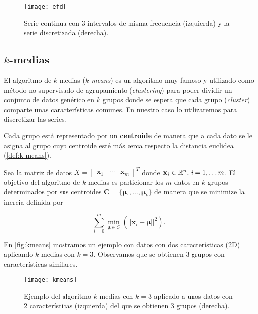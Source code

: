 \begin{figure}[htpb]
  \centering
  \texttt{[image: efd]}
  \caption{Serie continua con 3 intervalos de misma frecuencia (izquierda) y la serie discretizada (derecha).}
  \label{fig:efd}
\end{figure}

\subsection{$k$-medias}

El algoritmo de $k$-medias (\emph{$k$-means}) \cite{macqueen1967some} es un algoritmo muy famoso y utilizado como método no supervisado de agrupamiento (\emph{clustering}) para poder dividir un conjunto de datos genérico en $k$ grupos donde se espera que cada grupo (\emph{cluster}) comparte unas características comunes. En nuestro caso lo utilizaremos para discretizar las series.

Cada grupo está representado por un \textbf{centroide} de manera que a cada dato se le asigna al grupo cuyo centroide esté más cerca respecto la distancia euclidea (\autoref{def:k-means}).

\begin{definicion}[$k$-medias]
  Sea la matriz de datos $X = \begin{bmatrix} \textbf{x}_1 & \cdots & \textbf{x}_m \end{bmatrix}^T$ donde $\textbf{x}_i \in \mathbb{R}^n, \, i = 1, \ldots m$. El objetivo del algoritmo de $k$-medias es particionar los $m$ datos en $k$ grupos determinados por sus centroides $\textbf{C} = \{\pmb{\mu}_1, \ldots, \pmb{\mu}_k\}$ de manera que se minimize la inercia definida por

  $$\sum \limits^m_{i = 0} \min \limits_{\pmb{\mu} \in C} \left(||\textbf{x}_i - \pmb\mu ||^2 \right).$$
  \label{def:k-means}
\end{definicion}

En \autoref{fig:kmeans} \cite{ruiz2018kmeans} mostramos un ejemplo con datos con dos características (2D) aplicando $k$-medias con $k = 3$. Observamos que se obtienen 3 grupos con características similares.

\begin{figure}[htpb]
  \centering
  \texttt{[image: kmeans]}
  \caption{Ejemplo del algoritmo $k$-medias con $k=3$ aplicado a unos datos con 2 características (izquierda) del que se obtienen 3 grupos (derecha).}
  \label{fig:kmeans}
\end{figure}

